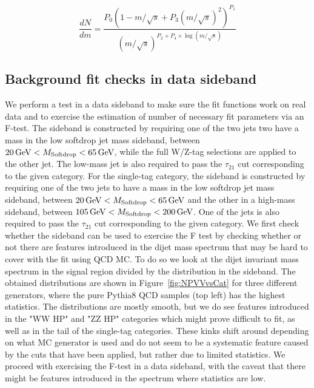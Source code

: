 \begin{equation}
\label{eq:dijet7}
\frac{dN}{dm}= \frac{ P_0(1-m/\sqrt{s}+P_3(m/\sqrt{s})^2)^{P_1} } { (m/\sqrt{s})^{P_2+P_4\times\log(m/\sqrt{s})} }
\end{equation}

\subsection{Background fit checks in data sideband}
\label{sec:app:2016bkgfit}
We perform a test in a data sideband to make sure the fit functions work on real data and to exercise the estimation of number of necessary fit parameters via an F-test.
The sideband is constructed by requiring one of the two jets two have a mass in the low softdrop jet mass sideband, between $20 \,\text{Ge\hspace{-.08em}V} < M_{\rm{Softdrop}} < 65 \,\text{Ge\hspace{-.08em}V}$, while the full W/Z-tag selections are applied to the other jet. The low-mass jet is also required to pass the $\tau_{21}$ cut corresponding to the given category. For the single-tag category, the sideband is constructed by requiring one of the two jets to have a mass in the low softdrop jet mass sideband, between $20 \,\text{Ge\hspace{-.08em}V} < M_{\rm{Softdrop}} < 65 \,\text{Ge\hspace{-.08em}V}$ and the other in a high-mass sideband, between $105 \,\text{Ge\hspace{-.08em}V} < M_{\rm{Softdrop}} < 200 \,\text{Ge\hspace{-.08em}V}$. One of the jets is also required to pass the $\tau_{21}$ cut corresponding to the given category.
We first check whether the sideband can be used to exercise the F test by checking whether or not there are features introduced in the dijet mass spectrum that may be hard to cover with the fit using QCD MC. To do so we look at the dijet invariant mass spectrum in the signal region divided by the distribution in the sideband. The obtained distributions are shown in Figure~\ref{fig:NPVVvsCat} for three different generators, where the pure Pythia8 QCD samples (top left) has the highest statistics. The  distributions are mostly smooth, but we do see features introduced in the "WW HP" and "ZZ HP" categories which might prove difficult to fit, as well as in the tail of the single-tag categories. These kinks shift around depending on what MC generator is used and do not seem to be a systematic feature caused by the cuts that have been applied, but rather due to limited statistics. We proceed with exercising the F-test in a data sideband, with the caveat that there might be features introduced in the spectrum where statistics are low.

